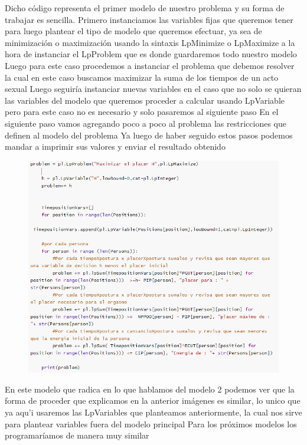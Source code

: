 \documentclass{llncs}
\begin{document}
Dicho código representa el primer modelo de nuestro problema y su forma de trabajar es sencilla. Primero instanciamos las variables fijas que queremos tener para luego plantear el tipo de modelo que queremos efectuar, ya sea de minimización o maximización usando la sintaxis LpMinimize o LpMaximize a la hora de instanciar el LpProblem que es donde guardaremos todo nuestro modelo
\newline
\newline
Luego para este caso procedemos a instanciar el problema que debemos resolver la cual en este caso buscamos maximizar la suma de los tiempos de un acto sexual
\newline
\newline
Luego seguiría instanciar nuevas variables en el caso que no solo se quieran las variables del modelo que queremos proceder a calcular usando LpVariable pero para este caso no es necesario y solo pasaremos al siguiente paso
\newline
\newline
En el siguiente paso vamos agregando poco a poco al problema las restricciones que definen al modelo del problema
\newline
\newline
Ya luego de haber seguido estos pasos podemos mandar a imprimir sus valores y enviar el resultado obtenido
\newpage

\begin{figure}
	\centering
	\includegraphics[width=0.7\linewidth]{Imagenes/modelo2-Guia}
	\label{fig:modelo2-guia}
\end{figure}

En este modelo que radica en lo que hablamos del modelo 2 podemos ver que la forma de proceder que explicamos en la anterior imágenes es similar, lo unico que ya aqu'i usaremos las LpVariables que planteamos anteriormente, la cual nos sirve para plantear variables fuera del modelo principal
\newline
\newline
Para los próximos modelos los programaríamos de manera muy similar
\end{document}
